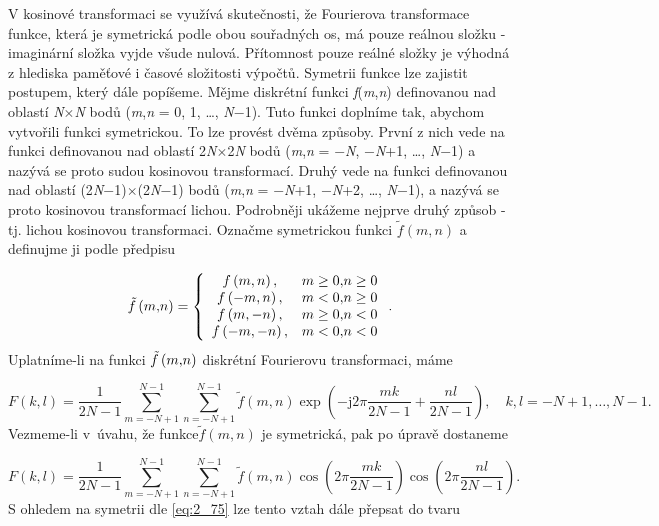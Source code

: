V kosinové transformaci se využívá skutečnosti, že Fourierova transformace funkce, která je symetrická podle obou souřadných os, má pouze reálnou složku - imaginární složka vyjde všude nulová. Přítomnost pouze reálné složky je výhodná z hlediska paměťové i časové složitosti výpočtů. Symetrii funkce lze zajistit postupem, který dále popíšeme. Mějme diskrétní funkci \textit{f}(\textit{m},\textit{n}) definovanou nad oblastí \textit{N}$\times$\textit{N} bodů (\textit{m},\textit{n} = 0, 1, \dots, \textit{N}$-$1). Tuto funkci doplníme tak, abychom vytvořili funkci symetrickou. To lze provést dvěma způsoby. První z nich vede na funkci definovanou nad oblastí 2\textit{N}$\times$2\textit{N} bodů (\textit{m},\textit{n} = $-$\textit{N}, $-$\textit{N}+1, \dots, \textit{N}$-$1) a nazývá se proto sudou kosinovou transformací. Druhý vede na funkci definovanou nad oblastí (2\textit{N}$-$1)$\times$(2\textit{N}$-$1) bodů (\textit{m},\textit{n} = $-$\textit{N}+1, $-$\textit{N}+2, \dots, \textit{N}$-$1), a nazývá se proto kosinovou transformací lichou. Podrobněji ukážeme nejprve druhý způsob - tj. lichou kosinovou transformaci. Označme symetrickou funkci $\tilde{f}\left(m, n\right)$ a definujme ji podle předpisu

\begin{equation} \label{eq:2_75} 
    \tilde{f}\left(m{\rm ,}n\right)=\left\{\begin{array}{cc} {f\left(m,n\right),} & {m\ge 0{\rm ,}n\ge 0} \\ {f\left(-m,n\right),} & {m<0{\rm ,}n\ge 0} \\ {f\left(m,-n\right),} & {m\ge 0{\rm ,}n<0} \\ {f\left(-m,-n\right),} & {m<0{\rm ,}n<0} \end{array}\right. .  
\end{equation} 
Uplatníme-li na funkci $\tilde{f}\left(m{\rm ,}n\right)$ diskrétní Fourierovu transformaci, máme

\begin{equation} \label{eq:2_76} 
    F(k, l) = \frac{1}{2N - 1} \sum\limits_{m=-N+1}^{N-1} \sum\limits_{n=-N+1}^{N-1} \tilde{f}(m, n) \exp \left( - \mathrm{j} 2 \pi \frac{mk}{2N-1} + \frac{nl}{2N-1}\right), \quad k, l = -N+1, \dots, N-1.
\end{equation} 
Vezmeme-li v~úvahu, že funkce$\tilde{f}(m, n)$ je symetrická, pak po úpravě dostaneme

\begin{equation} \label{eq:2_77} 
    F(k, l) = \frac{1}{2N - 1} \sum\limits_{m=-N+1}^{N-1} \sum\limits_{n=-N+1}^{N-1} \tilde{f}(m, n) \cos \left( 2 \pi \frac{mk}{2N-1} \right) \cos \left( 2 \pi \frac{nl}{2N-1}\right).
\end{equation} 
S ohledem na symetrii dle \eqref{eq:2_75} lze tento vztah dále přepsat do tvaru

